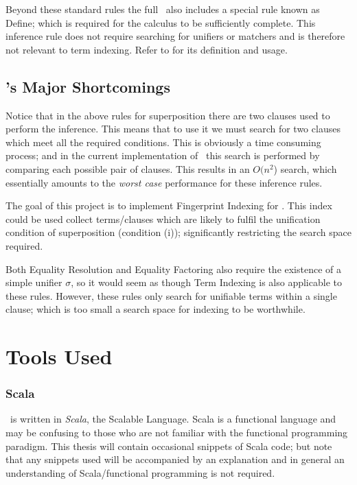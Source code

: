 Beyond these standard rules the full \HSWAC\ also includes a special
rule known as Define; which is required for the calculus to be sufficiently
complete. This inference rule does not require searching for unifiers or matchers
and is therefore not relevant to term indexing. Refer to \cite{baum13} for its
definition and usage.

\subsection{\Beagle's Major Shortcomings}
\label{sec:shortcomings}
Notice that in the above rules for superposition there are two clauses used
to perform the inference. This means that to use it we must search for two clauses
which meet all the required conditions. This is obviously a time consuming process;
and in the current implementation of \beagle\ this search is performed by comparing
each possible pair of clauses. This results in an $O(n^2$) search, which essentially amounts to the \emph{worst case}
performance for these inference rules.

The goal of this project is to implement Fingerprint Indexing for \beagle.
This index could be used collect terms/clauses which are likely to fulfil the unification
condition of superposition (condition (i)); significantly restricting the search space required.

Both Equality Resolution and Equality Factoring also require the existence of a
simple unifier $\sigma$, so it would seem as though Term Indexing is also applicable to these rules.
However, these rules only search for unifiable terms within a single clause; which is too small a search space
for indexing to be worthwhile.

\section{Tools Used}

\subsubsection{Scala}
\label{sec:scala}

\Beagle\ is written in \emph{Scala}, the Scalable Language. Scala
is a functional language and may be confusing to those who are not familiar with the
functional programming paradigm. This thesis will contain occasional snippets of
Scala code; but note that any snippets used will be accompanied by an explanation
and in general an understanding of Scala/functional programming is not required.
\cite{scala}

